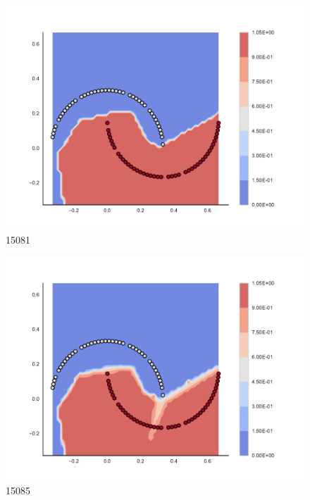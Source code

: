 \begin{subfigure}[b]{0.09\textwidth}
    \includegraphics[clip, trim=2.35cm 1.75cm 4.5cm 0cm,width=\textwidth]{img/convergence/15081.pdf}
    \caption{15081}
    \label{fig:convergence_15081}
\end{subfigure}
%
\begin{subfigure}[b]{0.09\textwidth}
    \includegraphics[clip, trim=2.35cm 1.75cm 4.5cm 0cm,width=\textwidth]{img/convergence/15085.pdf}
    \caption{15085}
    \label{fig:convergence_15085}
\end{subfigure}
%
